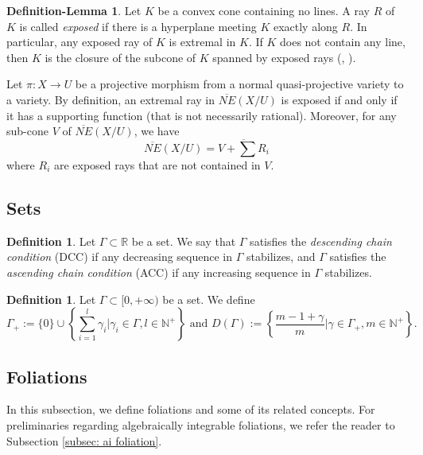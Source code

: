 \documentclass[11pt]{amsart}
\numberwithin{equation}{section}
\newcommand{\Rr}{\mathbb{R}}
\newcommand{\Ii}{\Gamma}
\theoremstyle{definition}
\newtheorem{defn}[thm]{Definition}
\theoremstyle{definition}
\newtheorem{deflem}[thm]{Definition-Lemma}
\theoremstyle{definition}
\begin{document}
\begin{deflem}\label{deflem: exposed ray}
Let $K$ be a convex cone containing no lines. A ray $R$ of $K$ is called \emph{exposed} if there is a hyperplane meeting $K$ exactly along $R$. In particular, any exposed ray of $K$ is extremal in $K$. If $K$ does not contain any line, then $K$ is the closure of the subcone of $K$ spanned by exposed rays (\cite[Corollary 18.7.1]{Roc97}, \cite[Lemma 6.2]{Spi20}).

Let $\pi: X\rightarrow U$ be a projective morphism from a normal quasi-projective variety to a variety. By definition, an extremal ray in $\overline{NE}(X/U)$ is exposed if and only if it has a supporting function (that is not necessarily rational). Moreover, for any sub-cone $V$ of $\overline{NE}(X/U)$, we have
$$\overline{NE}(X/U)=\overline{V+\sum R_i}$$
where $R_i$ are exposed rays that are not contained in $V$.
\end{deflem}




\subsection{Sets}

\begin{defn}\label{defn: DCC and ACC}
Let $\Ii\subset\Rr$ be a set. We say that $\Ii$ satisfies the \emph{descending chain condition} (DCC) if any decreasing sequence in $\Ii$ stabilizes, and $\Ii$ satisfies the \emph{ascending chain condition} (ACC) if any increasing sequence in $\Ii$ stabilizes. 
\end{defn}

\begin{defn}\label{defn: derived set}
    Let $\Ii\subset [0,+\infty)$ be a set. We define 
    $$\Ii_+:=\{0\}\cup\left\{\sum_{i=1}^l\gamma_i\bigg| \gamma_i\in\Ii,l\in\mathbb N^+\right\}\text{ and }D(\Ii):=\left\{\frac{m-1+\gamma}{m}\bigg|\gamma\in\Ii_+,m\in\mathbb N^+\right\}.$$
\end{defn}



\subsection{Foliations} In this subsection, we define foliations and some of its related concepts. For preliminaries regarding algebraically integrable foliations, we refer the reader to Subsection \ref{subsec: ai foliation}.
\end{document}
